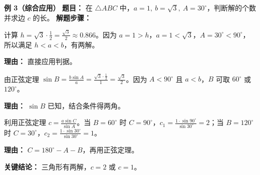 \begin{examplebox}
	\medskip
	\textbf{\textcolor{CExample}{例 3（综合应用）}}
	\textbf{\textcolor{CExample}{题目：}}
	在 $\triangle ABC$ 中，$a=1,\ b=\sqrt{3},\ A=30^\circ$，判断解的个数并求边 $c$ 的长。
	\textbf{\textcolor{CExample}{解题步骤：}}
	\begin{description}[style=nextline, leftmargin=2.8em, labelsep=0.5em, itemsep=0.45em]
		\item[\textbf{第一步（判据判断）：}]
			计算 $h = \sqrt{3} \cdot \frac12 = \frac{\sqrt{3}}{2} \approx 0.866$。因为 $a=1 > h$，$a=1 < \sqrt{3}$，$A=30^\circ<90^\circ$，所以满足 $h<a<b$，有两解。
			\par\textbf{理由：} 直接应用判据。
		\item[\textbf{第二步（求角 B）：}]
			由正弦定理 $\sin B = \frac{b\sin A}{a} = \frac{\sqrt{3}\cdot\frac12}{1} = \frac{\sqrt{3}}{2}$。因为 $A<90^\circ$ 且 $a<b$，$B$ 可取 $60^\circ$ 或 $120^\circ$。
			\par\textbf{理由：} $\sin B$ 已知，结合条件得两角。
		\item[\textbf{第三步（求边 c）：}]
			利用正弦定理 $c = \frac{a\sin C}{\sin A}$。当 $B=60^\circ$ 时 $C=90^\circ$，$c_1 = \frac{1\cdot\sin90^\circ}{\sin30^\circ}=2$；当 $B=120^\circ$ 时 $C=30^\circ$，$c_2 = \frac{1\cdot\sin30^\circ}{\sin30^\circ}=1$。
			\par\textbf{理由：} $C=180^\circ-A-B$，再用正弦定理。
	\end{description}
	\textbf{\textcolor{CExample}{关键结论：}}
	三角形有两解，$c=2$ 或 $c=1$。
\end{examplebox}

